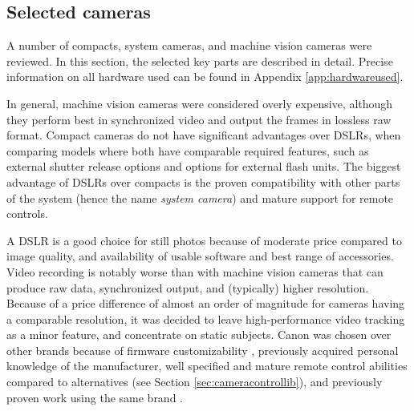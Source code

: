 

\subsection{Selected cameras} %

A number of compacts, system cameras, and machine vision cameras were reviewed.
In this section, the selected key parts are described in detail.
Precise information on all hardware used can be found in Appendix \ref{app:hardwareused}.

In general, machine vision cameras were considered overly expensive, although they perform best in synchronized video and output the frames in lossless raw format.
Compact cameras do not have significant advantages over DSLRs, when comparing models where both have comparable required features, such as external shutter release options and options for external flash units.
The biggest advantage of DSLRs over compacts is the proven compatibility with other parts of the system (hence the name \emph{system camera}) and mature support for remote controls.

A DSLR is a good choice for still photos because of moderate price compared to image quality, and availability of usable software and best range of accessories.
Video recording is notably worse than with machine vision cameras that can produce raw data, synchronized output, and (typically) higher resolution.
Because of a price difference of almost an order of magnitude for cameras having a comparable resolution, it was decided to leave high-performance video tracking as a minor feature, and concentrate on static subjects.
Canon was chosen over other brands because of firmware customizability \cite{magiclantern}, previously acquired personal knowledge of the manufacturer, well specified and mature remote control abilities compared to alternatives (see Section \ref{sec:cameracontrollib}), and previously proven work using the same brand \cite{ir-ltd,ten24,capturelab,agisoftforum,ghosh2011multiview}.

